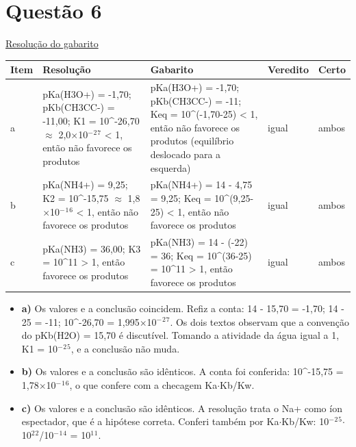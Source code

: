 \documentclass{article}%
\begin{document}
\section*{Questão 6}%
\href{https://poliedroresolve.sistemapoliedro.com.br/vestibulares/ita/2026/ita-2-fase-dia-2-29-10-2025-2-fase-dia-2/dissertativa-6-quimica-2-fase-dia-2-ita-2026}{Resolução do gabarito}\par\smallskip%
\begin{longtable}{@{}p{} p{} p{} p{} p{}@{}}\toprule Item & Resolução & Gabarito & Veredito & Certo \\ \midrule
a & pKa(H3O+) = -1,70; pKb(CH3CC-) = -11,00; K1 = 10\^{}-26,70 $\approx$ 2,0$\times$10$^{-}$$^2$$^{7}$ < 1, então não favorece os produtos & pKa(H3O+) = -1,70; pKb(CH3CC-) = -11; Keq = 10\^{}(-1,70-25) < 1, então não favorece os produtos (equilíbrio deslocado para a esquerda) & igual & ambos \\
b & pKa(NH4+) = 9,25; K2 = 10\^{}-15,75 $\approx$ 1,8$\times$10$^{-}$$^{1}$$^{6}$ < 1, então não favorece os produtos & pKa(NH4+) = 14 - 4,75 = 9,25; Keq = 10\^{}(9,25-25) < 1, então não favorece os produtos & igual & ambos \\
c & pKa(NH3) = 36,00; K3 = 10\^{}11 > 1, então favorece os produtos & pKa(NH3) = 14 - (-22) = 36; Keq = 10\^{}(36-25) = 10\^{}11 > 1, então favorece os produtos & igual & ambos \\
\bottomrule\end{longtable}%
\begin{itemize}%
\item%
\textbf{a)} Os valores e a conclusão coincidem. Refiz a conta: 14 - 15,70 = -1,70; 14 - 25 = -11; 10\^{}-26,70 = 1,995$\times$10$^{-}$$^2$$^{7}$. Os dois textos observam que a convenção do pKb(H2O) = 15,70 é discutível. Tomando a atividade da água igual a 1, K1 = 10$^{-}$$^2$$^{5}$, e a conclusão não muda.%
\item%
\textbf{b)} Os valores e a conclusão são idênticos. A conta foi conferida: 10\^{}-15,75 = 1,78$\times$10$^{-}$$^{1}$$^{6}$, o que confere com a checagem Ka$\cdot$Kb/Kw.%
\item%
\textbf{c)} Os valores e a conclusão são idênticos. A resolução trata o Na+ como íon espectador, que é a hipótese correta. Conferi também por Ka$\cdot$Kb/Kw: 10$^{-}$$^2$$^{5}$$\cdot$10$^2$$^2$/10$^{-}$$^{1}$$^{4}$ = 10$^{1}$$^{1}$.%
\end{itemize}%
\end{document}
